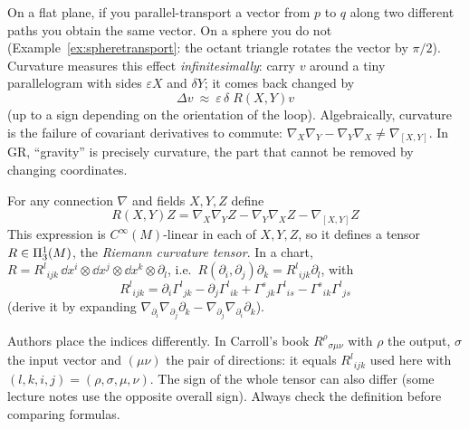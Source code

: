 \begin{intuition}[{curvature = failure of parallel transport to be path independent}]
On a flat plane, if you parallel-transport a vector from $p$ to $q$ along two different paths you obtain the same vector. On a sphere you do not (Example~\ref{ex:spheretransport}: the octant triangle rotates the vector by $\pi/2$). Curvature measures this effect \emph{infinitesimally}: carry $v$ around a tiny parallelogram with sides $\varepsilon X$ and $\delta Y$; it comes back changed by
\[
\Delta v\ \approx\ \varepsilon\,\delta\; R(X,Y)v
\]
(up to a sign depending on the orientation of the loop). Algebraically, curvature is the failure of covariant derivatives to commute: $\nabla_X\nabla_Y-\nabla_Y\nabla_X\neq\nabla_{[X,Y]}$. In GR, ``gravity'' is precisely curvature, the part that cannot be removed by changing coordinates.
\end{intuition}

\begin{formal}
For any connection $\nabla$ and fields $X,Y,Z$ define
\[
\boxed{\ R(X,Y)Z=\nabla_X\nabla_YZ-\nabla_Y\nabla_XZ-\nabla_{[X,Y]}Z\ }
\]
This expression is $C^\infty(M)$-linear in each of $X,Y,Z$, so it defines a tensor $R\in\Pi^{1}_{3}(M)$, the \emph{Riemann curvature tensor}. In a chart, $R=R^l{}_{ijk}\,\dd x^i\otimes\dd x^j\otimes\dd x^k\otimes\partial_l$, i.e.\ $R(\partial_i,\partial_j)\partial_k=R^l{}_{ijk}\partial_l$, with
\begin{equation}\label{eq:riemanncomp}
\boxed{\ R^l{}_{ijk}=\partial_i\Gamma^l{}_{jk}-\partial_j\Gamma^l{}_{ik}+\Gamma^s{}_{jk}\Gamma^l{}_{is}-\Gamma^s{}_{ik}\Gamma^l{}_{js}\ }
\end{equation}
(derive it by expanding $\nabla_{\partial_i}\nabla_{\partial_j}\partial_k-\nabla_{\partial_j}\nabla_{\partial_i}\partial_k$). 
\end{formal}
\begin{pitfall}[{index conventions}]
Authors place the indices differently. In Carroll's book \cite{Carroll} $R^\rho{}_{\sigma\mu\nu}$ with $\rho$ the output, $\sigma$ the input vector and $(\mu\nu)$ the pair of directions: it equals $R^l{}_{ijk}$ used here with $(l,k,i,j)=(\rho,\sigma,\mu,\nu)$. The sign of the whole tensor can also differ (some lecture notes use the opposite overall sign). Always check the definition before comparing formulas.
\end{pitfall}
